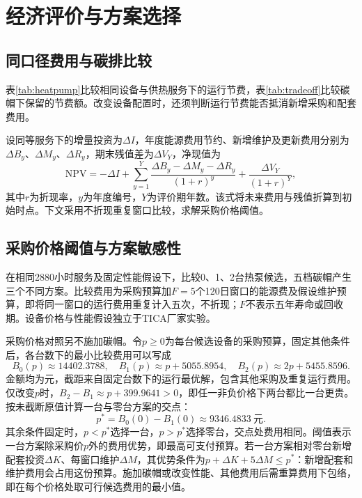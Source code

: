 \section{经济评价与方案选择}
\subsection{同口径费用与碳排比较}

表\ref{tab:heatpump}比较相同设备与供热服务下的运行节费，表\ref{tab:tradeoff}比较碳帽下保留的节费额。改变设备配置时，还须判断运行节费能否抵消新增采购和配套费用。

设同等服务下的增量投资为$\Delta I$，年度能源费用节约、新增维护及更新费用分别为$\Delta B_y$、$\Delta M_y$、$\Delta R_y$，期末残值差为$\Delta V_Y$，净现值为
\begin{equation}
\mathrm{NPV}=-\Delta I+\sum_{y=1}^{Y}\frac{\Delta B_y-\Delta M_y-\Delta R_y}{(1+r)^y}+\frac{\Delta V_Y}{(1+r)^Y},
\label{eq:npv}
\end{equation}
其中$r$为折现率，$y$为年度编号，$Y$为评价期年数。该式将未来费用与残值折算到初始时点。下文采用不折现重复窗口比较，求解采购价格阈值。

\subsection{采购价格阈值与方案敏感性}

在相同2880小时服务及固定性能假设下，比较0、1、2台热泵候选，五档碳帽产生三个不同方案。比较费用为采购预算加$F=5$个120日窗口的能源费及假设维护预算，即将同一窗口的运行费用重复计入五次，不折现；$F$不表示五年寿命或回收期。设备价格与性能假设独立于TICA厂家实验。

采购价格对照另不施加碳帽。令$p\geq0$为每台候选设备的采购预算，固定其他条件后，各台数下的最小比较费用可以写成
\begin{equation}
B_0(p)\approx14402.3788,\quad
B_1(p)\approx p+5055.8954,\quad
B_2(p)\approx2p+5455.8596.
\label{eq:price-lines}
\end{equation}
金额均为元，截距来自固定台数下的运行最优解，包含其他采购及重复运行费用。仅改变$p$时，$B_2-B_1\approx p+399.9641>0$，即任一非负价格下两台都比一台更贵。按未截断原值计算一台与零台方案的交点：
\begin{equation}
p^*=B_0(0)-B_1(0)\approx9346.4833\ \text{元}.
\label{eq:price-threshold}
\end{equation}
其余条件固定时，$p<p^*$选择一台，$p>p^*$选择零台，交点处费用相同。阈值表示一台方案除采购价$p$外的费用优势，即最高可支付预算。若一台方案相对零台新增配套投资$\Delta K$、每窗口维护$\Delta M$，其优势条件为\mbox{$p+\Delta K+5\Delta M\leq p^*$}：新增配套和维护费用会占用这份预算。施加碳帽或改变性能、其他费用后需重算费用下包络，即在每个价格处取可行候选费用的最小值。
